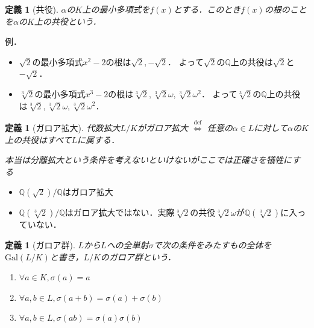 \documentclass[dvipdfmx,17pt]{beamer}
\theoremstyle{plain}
\newtheorem{defi}[thm]{定義}
\newcommand{\Q}{\mathbb{Q}}
\begin{document}
\begin{frame}
\begin{defi}[共役]
$\alpha$の$K$上の最小多項式を$f(x)$とする．このとき$f(x)$の根のことを$\alpha$の$K$上の共役という．
\end{defi}
\end{frame}

\begin{frame}
例．
\begin{itemize}
\item $\sqrt{2}$の最小多項式$x^2-2$の根は$\sqrt{2}, -\sqrt{2}$．
よって$\sqrt{2}$の$\Q$上の共役は$\sqrt{2}$と$-\sqrt{2}$．
\item $\sqrt[3]{2}$の最小多項式$x^3-2$の根は$\sqrt[3]{2}, \sqrt[3]{2}\omega, \sqrt[3]{2}\omega^2$．
よって$\sqrt[3]{2}$の$\Q$上の共役は$\sqrt[3]{2}, \sqrt[3]{2}\omega, \sqrt[3]{2}\omega^2$．
\end{itemize}
\end{frame}

\begin{frame}
\begin{defi}[ガロア拡大]
代数拡大$L/K$がガロア拡大 $\overset{\mathrm{def}}{\iff}$ 任意の$\alpha \in L$に対して$\alpha$の$K$上の共役はすべて$L$に属する．

{\small 本当は分離拡大という条件を考えないといけないがここでは正確さを犠牲にする}
\end{defi}
\end{frame}

\begin{frame}
\begin{itemize}
\item $\Q(\sqrt{2})/\Q$はガロア拡大
\item $\Q(\sqrt[3]{2})/\Q$はガロア拡大ではない．実際$\sqrt[3]{2}$の共役$\sqrt[3]{2} \omega$が$\Q(\sqrt[3]{2})$に入っていない．
\end{itemize}
\end{frame}

\begin{frame}
\begin{defi}[ガロア群]
$L$から$L$への全単射$\sigma$で次の条件をみたすもの全体を$\mathrm{Gal}(L/K)$と書き，$L/K$のガロア群という．
\begin{enumerate}
\item $\forall a \in K, \sigma(a) = a$
\item $\forall a, b \in L, \sigma(a+b) = \sigma(a) + \sigma(b)$
\item $\forall a, b \in L, \sigma(ab) = \sigma(a)  \sigma(b)$
\end{enumerate}
\end{defi}
\end{frame}
\end{document}
